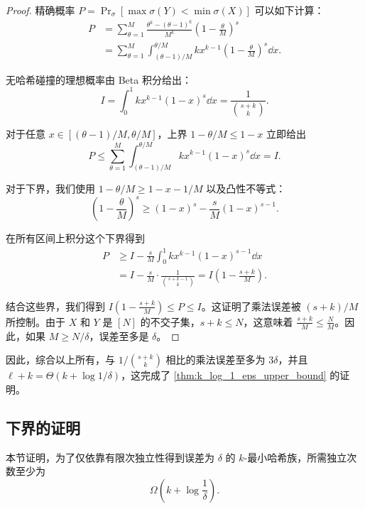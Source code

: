 \begin{proof}
    精确概率 $P = \Pr_{\sigma}\left[ \max \sigma(Y) < \min \sigma(X) \right]$ 可以如下计算：
    \begin{align*}
        P & = \sum_{\theta = 1}^M \frac{\theta^k - (\theta - 1)^k}{M^k} \left( 1 - \frac{\theta}{M} \right)^s \\
         & = \sum_{\theta = 1}^M \int_{(\theta - 1) / M}^{\theta / M} k x^{k-1} \left( 1 - \frac{\theta}{M} \right)^s \dd x.
    \end{align*}
    
    无哈希碰撞的理想概率由 Beta 积分给出：
    $$
    I = \int_0^1 k x^{k-1} (1-x)^s \dd x = \frac{1}{\binom{s+k}{k}}.
    $$
    
    对于任意 $x \in [(\theta - 1) / M, \theta / M]$，上界 $1 - \theta / M \le 1 - x$ 立即给出
    $$
    P \le \sum_{\theta = 1}^M \int_{(\theta - 1) / M}^{\theta / M} k x^{k-1} (1-x)^s \dd x = I.
    $$
    
    对于下界，我们使用 $1 - \theta / M \ge 1 - x - 1 / M$ 以及凸性不等式：
    $$
    \left( 1 - \frac{\theta}{M} \right)^s \ge (1-x)^s - \frac{s}{M}(1-x)^{s-1}.
    $$
    
    在所有区间上积分这个下界得到
    \begin{align*}
        P & \ge I - \frac{s}{M} \int_0^1 k x^{k-1}(1-x)^{s-1} \dd x \\
         & = I - \frac{s}{M} \cdot \frac{1}{\binom{s + k - 1}{k}} = I \left( 1 - \frac{s + k}{M} \right).
    \end{align*}
    
    结合这些界，我们得到 $I \left( 1 - \frac{s+k}{M} \right) \le P \le I$。这证明了乘法误差被 $(s + k) / M$ 所控制。由于 $X$ 和 $Y$ 是 $[N]$ 的不交子集，$s+k \le N$，这意味着 $\frac{s+k}{M} \le \frac{N}{M}$。因此，如果 $M \ge N / \delta$，误差至多是 $\delta$。
\end{proof}

因此，综合以上所有，与 $1 / \binom{s + k}{k}$ 相比的乘法误差至多为 $3 \delta$，并且 $\ell + k = \Theta(k + \log 1 / \delta)$，这完成了 \cref{thm:k_log_1_eps_upper_bound} 的证明。

\subsection{下界的证明}\label{sec:lower_bound}

本节证明，为了仅依靠有限次独立性得到误差为 $\delta$ 的 $k$-最小哈希族，所需独立次数至少为
$$
    \Omega\left(k+\log\frac{1}{\delta}\right).
$$

